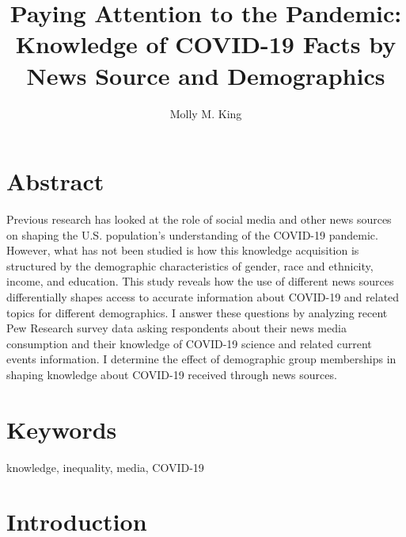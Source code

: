 \documentclass[11pt]{article}
\begin{document}
\title{Paying Attention to the Pandemic: \\ Knowledge of COVID-19 Facts by News Source and Demographics}

\author{Molly M. King}
\date{}

\clearpage\maketitle

\section{Abstract}\label{sec:abstract}
\pagestyle{fancy} %
\setcounter{page}{1} %

Previous research has looked at the role of social media and other news sources on shaping the U.S. population’s understanding of the COVID-19 pandemic. However, what has not been studied is how this knowledge acquisition is structured by the demographic characteristics of gender, race and ethnicity, income, and education. This study reveals how the use of different news sources differentially shapes access to accurate information about COVID-19 and related topics for different demographics. I answer these questions by analyzing recent Pew Research survey data asking respondents about their news media consumption and their knowledge of COVID-19 science and related current events information. I determine the effect of demographic group memberships in shaping knowledge about COVID-19 received through news sources.

\section{Keywords}

knowledge, inequality, media, COVID-19

\newpage

\section{Introduction}\label{sec:introduction}
\end{document}
